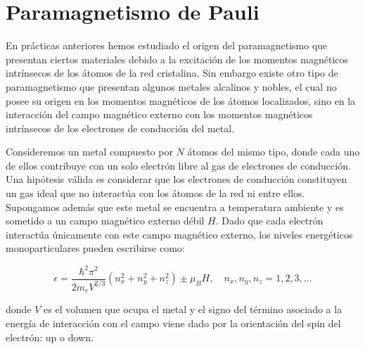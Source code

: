 \documentclass[a4paper,11pt]{article}
\begin{document}
\section{Paramagnetismo de Pauli}

En prácticas anteriores hemos estudiado el origen del paramagnetismo que
presentan ciertos materiales debido a la excitación de los momentos
magnéticos intrínsecos de los átomos de la red cristalina.
Sin embargo existe otro tipo de paramagnetismo que presentan algunos metales
alcalinos y nobles, el cual no posee su origen en los momentos magnéticos de
los átomos localizados, sino en la interacción del campo magnético externo
con los momentos magnéticos intrínsecos de los electrones de conducción del
metal.

Consideremos un metal compuesto por $N$ átomos del mismo tipo, donde cada uno
de ellos contribuye con un solo electrón libre al gas de electrones de
conducción.
Una hipótesis válida es considerar que los electrones de conducción
constituyen un gas ideal que no interactúa con los átomos de la red ni entre
ellos.
Supongamos además que este metal se encuentra a temperatura ambiente y es
sometido a un campo magnético externo débil $H$.
Dado que cada electrón interactúa únicamente con este campo magnético
externo, los niveles energéticos monoparticulares pueden escribirse como:

$$
\epsilon =
\frac{\hbar^2 \pi^2}{2m_e V^{2/3}} (n_x^2 + n_y^2 + n_z^2) \pm \mu_B H,
\quad
n_x, n_y, n_z = 1, 2, 3, \dots
$$

\noindent donde $V$ es el volumen que ocupa el metal y el signo del término
asociado a la energía de interacción con el campo viene dado por la
orientación del spin del electrón: up o down.
\end{document}
